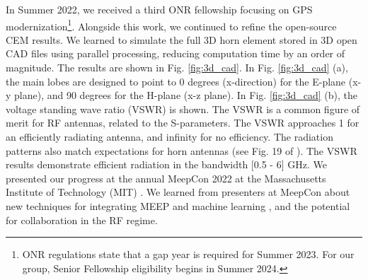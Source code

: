 \documentclass[11pt]{amsart}
\begin{document}
In Summer 2022, we received a third ONR fellowship focusing on GPS modernization\footnote{ONR regulations state that a gap year is required for Summer 2023.  For our group, Senior Fellowship eligibility begins in Summer 2024.}.  Alongside this work, we continued to refine the open-source CEM results.  We learned to simulate the full 3D horn element stored in 3D open CAD files using parallel processing, reducing computation time by an order of magnitude.  The results are shown in Fig. \ref{fig:3d_cad}.  In Fig. \ref{fig:3d_cad} (a), the main lobes are designed to point to 0 degrees (x-direction) for the E-plane (x-y plane), and 90 degrees for the H-plane (x-z plane).  In Fig. \ref{fig:3d_cad} (b), the voltage standing wave ratio (VSWR) is shown.  The VSWR is a common figure of merit for RF antennas, related to the S-parameters.  The VSWR approaches 1 for an efficiently radiating antenna, and infinity for no efficiency.  The radiation patterns also match expectations for horn antennas (see Fig. 19 of \cite{8786183}).  The VSWR results demonstrate efficient radiation in the bandwidth [0.5 - 6] GHz.  We presented our progress at the annual MeepCon 2022 at the Massachusetts Institute of Technology (MIT) \cite{meepcon2022}.  We learned from presenters at MeepCon about new techniques for integrating MEEP and machine learning \cite{meepcon2022_2}, and the potential for collaboration in the RF regime.
\end{document}
